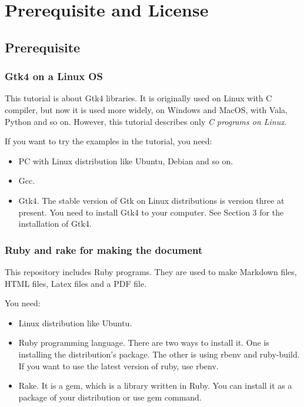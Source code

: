 \hypertarget{prerequisite-and-license}{%
\section{Prerequisite and License}\label{prerequisite-and-license}}

\hypertarget{prerequisite}{%
\subsection{Prerequisite}\label{prerequisite}}

\hypertarget{gtk4-on-a-linux-os}{%
\subsubsection{Gtk4 on a Linux OS}\label{gtk4-on-a-linux-os}}

This tutorial is about Gtk4 libraries. It is originally used on Linux
with C compiler, but now it is used more widely, on Windows and MacOS,
with Vala, Python and so on. However, this tutorial describes only
\emph{C programs on Linux}.

If you want to try the examples in the tutorial, you need:

\begin{itemize}
\tightlist
\item
  PC with Linux distribution like Ubuntu, Debian and so on.
\item
  Gcc.
\item
  Gtk4. The stable version of Gtk on Linux distributions is version
  three at present. You need to install Gtk4 to your computer. See
  Section 3 for the installation of Gtk4.
\end{itemize}

\hypertarget{ruby-and-rake-for-making-the-document}{%
\subsubsection{Ruby and rake for making the
document}\label{ruby-and-rake-for-making-the-document}}

This repository includes Ruby programs. They are used to make Markdown
files, HTML files, Latex files and a PDF file.

You need:

\begin{itemize}
\tightlist
\item
  Linux distribution like Ubuntu.
\item
  Ruby programming language. There are two ways to install it. One is
  installing the distribution's package. The other is using rbenv and
  ruby-build. If you want to use the latest version of ruby, use rbenv.
\item
  Rake. It is a gem, which is a library written in Ruby. You can install
  it as a package of your distribution or use gem command.
\end{itemize}

